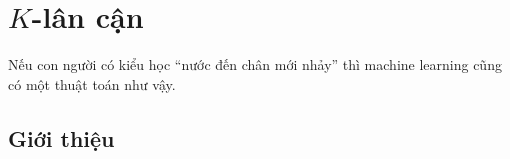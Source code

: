\chapter{$K$-lân cận}
\label{cha:knn}


Nếu con người có kiểu học ``nước đến chân mới nhảy'' thì machine
learning cũng có một thuật toán như vậy.


\section{Giới thiệu}







